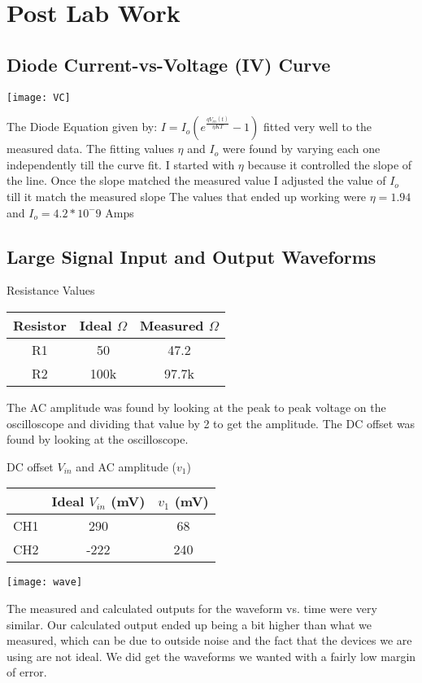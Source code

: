 \documentclass[12pt, oneside]{article}
\begin{document}
\section{Post Lab Work}
\subsection{Diode Current-vs-Voltage (IV) Curve}
\begin{center}
\texttt{[image: VC]}
\end{center}
The Diode Equation given by: $I=I_o(e^{\frac{qV_{in}(t)}{\eta KT}}-1)$ fitted very well to the measured data. The fitting values $\eta$ and $I_o$ were found by varying each one independently till the curve fit. I started with $\eta$ because it controlled the slope of the line. Once the slope matched the measured value I adjusted the value of $I_o$ till it match the measured slope The values that ended up working were $\eta = 1.94$ and $I_o = 4.2*10^-9$ Amps
\subsection{Large Signal Input and Output Waveforms}
\begin{center}
 Resistance Values\\
 \begin{tabular}{||c | c | c||} 
 \hline
 Resistor & Ideal $\Omega$ & Measured $\Omega$\\ 
 \hline
 R1 & 50 & 47.2\\
 \hline
 R2 & 100k & 97.7k\\
 
 \hline
\end{tabular}
\end{center}
The AC amplitude was found by looking at the peak to peak voltage on the oscilloscope and dividing that value by 2 to get the amplitude. The DC offset was found by looking at the oscilloscope.
\begin{center}
 DC offset $V_{in}$ and AC amplitude ($v_{1}$)\\
 \begin{tabular}{||c | c | c||} 
 \hline
   & Ideal $V_{in}$ (mV)& $v_{1}$ (mV)\\ 
 \hline
 CH1 & 290 & 68\\
 \hline
 CH2 & -222 & 240\\

 \hline
\end{tabular}
\end{center}
\begin{center}
\texttt{[image: wave]}
\end{center}
The measured and calculated outputs for the waveform vs. time were very similar. Our calculated output ended up being a bit higher than what we measured, which can be due to outside noise and the fact that the devices we are using are not ideal. We did get the waveforms we wanted with a fairly low margin of error.
\end{document}
